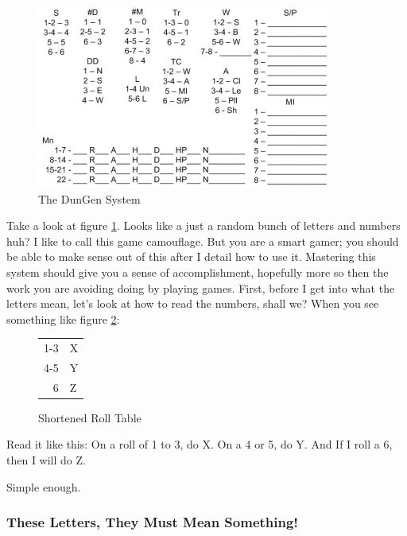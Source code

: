 \documentclass[a6paper,hidelinks]{article}
\begin{document}
\begin{figure}[!]
\caption{The DunGen System}
\label{fig:the_dungen_system}
\includegraphics[width=0.8\linewidth]{dungen_system_snip.png}
%
\end{figure}

Take a look at figure \ref{fig:the_dungen_system}.
Looks like a just a random bunch of letters and numbers huh? I like to call this game camouflage. But you are a smart gamer; you should be able to make sense out of this after I detail how to use it. Mastering this system
should give you a sense of accomplishment, hopefully more so then the work you are avoiding doing by playing games. First, before I get into what the letters mean, let's look at how to read the numbers, shall we?
When you see something like figure \ref{fig:shortened_roll_table}:

\begin{figure}[h]
\caption{Shortened Roll Table}
\label{fig:shortened_roll_table}
\centering
\begin{tabular}{| r | l |}
\hline
1-3 & X \\
4-5 & Y \\
  6 & Z \\
\hline
\end{tabular}
\end{figure}

Read it like this: On a roll of 1 to 3, do X. On a 4 or 5, do Y. And If I roll a 6,
then I will do Z.

Simple enough.


\subsubsection{These Letters, They Must Mean Something!}
\end{document}
